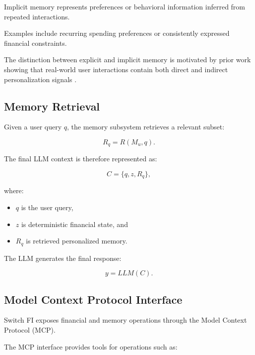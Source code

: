 \documentclass[conference]{IEEEtran}
\begin{document}
    Implicit memory represents preferences or behavioral information inferred
    from repeated interactions.
    
    Examples include recurring spending preferences or consistently
    expressed financial constraints.
    
    The distinction between explicit and implicit memory is motivated by
    prior work showing that real-world user interactions contain both direct
    and indirect personalization signals \cite{alpsbench}.
    
    \subsection{Memory Retrieval}
    
    Given a user query $q$, the memory subsystem retrieves a relevant subset:
    
    \begin{equation}
    R_q = R(M_u,q).
    \end{equation}
    
    The final LLM context is therefore represented as:
    
    \begin{equation}
    C = \{q,z,R_q\},
    \end{equation}
    
    where:
    
    \begin{itemize}
        \item $q$ is the user query,
        \item $z$ is deterministic financial state, and
        \item $R_q$ is retrieved personalized memory.
    \end{itemize}
    
    The LLM generates the final response:
    
    \begin{equation}
    y = LLM(C).
    \end{equation}
    
    \subsection{Model Context Protocol Interface}
    
    Switch FI exposes financial and memory operations through the Model
    Context Protocol (MCP).
    
    The MCP interface provides tools for operations such as:
    
\end{document}
